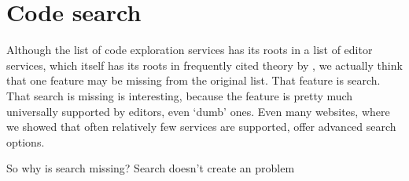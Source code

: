 \section{Code search}\label{sec:code-search}

Although the list of code exploration services has its roots in a list of editor services, which itself has its roots in
frequently cited theory by \textcite{ErdwegSV13}, we actually think that one feature may be missing from the original list.
That feature is search.
That search is missing is interesting, because the feature is pretty much universally supported by editors, even `dumb' ones.
Even many websites, where we showed that often relatively few services are supported, offer advanced search options.

So why is search missing?
Search doesn't create an \problem{\times} problem

